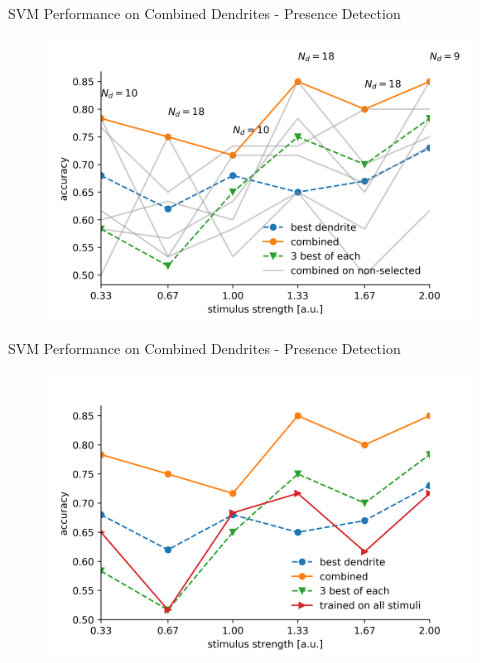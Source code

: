 \documentclass[10pt]{beamer}
\begin{document}
\begin{frame}[fragile]{SVM Performance on Combined Dendrites - Presence Detection}
\begin{center}
	\begin{figure}
      \includegraphics[width=1.0\textwidth]{combined_presence.png}
	\end{figure}
	\end{center}
\end{frame}

\begin{frame}[fragile]{SVM Performance on Combined Dendrites - Presence Detection}
\begin{center}
	\begin{figure}
      \includegraphics[width=1.0\textwidth]{combined_presence_alt.png}
	\end{figure}
	\end{center}
\end{frame}
\end{document}
